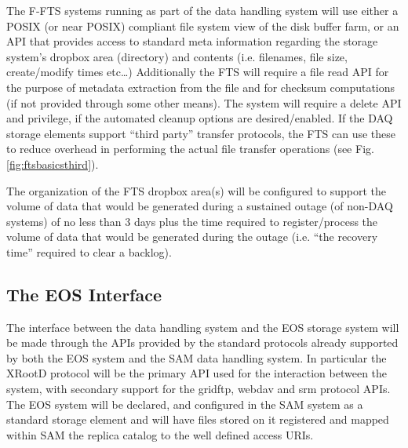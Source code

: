 \documentclass[pdftex,12pt,letter]{article}
\begin{document}
The F-FTS systems running as part of the data handling system will use either a POSIX (or near POSIX) compliant file system view of the disk buffer farm,
or an API that provides access to standard meta information regarding the storage system’s dropbox area (directory) and contents
(i.e. filenames, file size, create/modify times etc…)  Additionally the FTS will require a file read API for the purpose of metadata
extraction from the file and for checksum computations (if not provided through some other means).  The system will require a
delete API and privilege, if the automated cleanup options are desired/enabled.  If the DAQ storage elements support ``third party''
transfer protocols, the FTS can use these to reduce overhead in performing the actual file transfer operations  (see Fig. \ref{fig:ftsbasicsthird}).

The organization of the FTS dropbox area(s) will be configured to support the volume of data that would be generated during a
sustained outage (of non-DAQ systems) of no less than 3 days plus the time required to register/process the volume of data
that would be generated during the outage (i.e. ``the recovery time'' required to clear a backlog).

\subsection{The EOS Interface}
The interface between the data handling system and the EOS storage system will be made through the APIs
provided by the standard protocols already supported by both the EOS system and the SAM data handling system.
In particular the XRootD protocol will be the primary API used for the interaction between the system, with secondary
support for the gridftp, webdav and srm protocol APIs.  The EOS system will be declared, and configured in the SAM
system as a standard storage element and will have files stored on it registered and mapped within SAM the replica
catalog to the well defined access URIs. 
\end{document}
